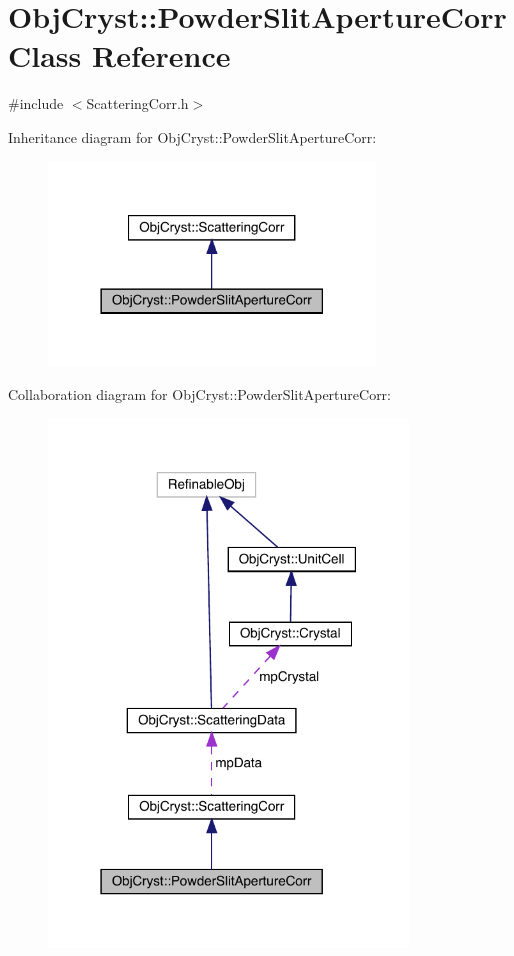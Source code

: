 \hypertarget{class_obj_cryst_1_1_powder_slit_aperture_corr}{}\section{Obj\+Cryst\+::Powder\+Slit\+Aperture\+Corr Class Reference}
\label{class_obj_cryst_1_1_powder_slit_aperture_corr}


{\ttfamily \#include $<$Scattering\+Corr.\+h$>$}



Inheritance diagram for Obj\+Cryst\+::Powder\+Slit\+Aperture\+Corr\+:
\nopagebreak
\begin{figure}[H]
\begin{center}
\leavevmode
\includegraphics[width=246pt]{class_obj_cryst_1_1_powder_slit_aperture_corr__inherit__graph}
\end{center}
\end{figure}


Collaboration diagram for Obj\+Cryst\+::Powder\+Slit\+Aperture\+Corr\+:
\nopagebreak
\begin{figure}[H]
\begin{center}
\leavevmode
\includegraphics[width=271pt]{class_obj_cryst_1_1_powder_slit_aperture_corr__coll__graph}
\end{center}
\end{figure}
